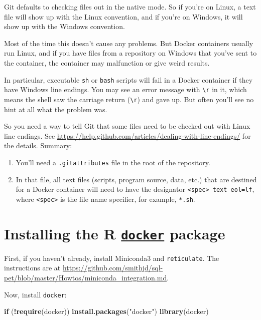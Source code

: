 \documentclass[]{book}
\newenvironment{Shaded}{\begin{snugshade}}{\end{snugshade}}
\newcommand{\ControlFlowTok}[1]{\textcolor[rgb]{0.13,0.29,0.53}{\textbf{#1}}}
\newcommand{\KeywordTok}[1]{\textcolor[rgb]{0.13,0.29,0.53}{\textbf{#1}}}
\newcommand{\NormalTok}[1]{#1}
\newcommand{\OperatorTok}[1]{\textcolor[rgb]{0.81,0.36,0.00}{\textbf{#1}}}
\newcommand{\StringTok}[1]{\textcolor[rgb]{0.31,0.60,0.02}{#1}}
\providecommand{\tightlist}{%
  \setlength{\itemsep}{0pt}\setlength{\parskip}{0pt}}
\theoremstyle{definition}
\theoremstyle{definition}
\theoremstyle{definition}
\theoremstyle{remark}
\begin{document}
Git defaults to checking files out in the native mode. So if you're on
Linux, a text file will show up with the Linux convention, and if you're
on Windows, it will show up with the Windows convention.

Most of the time this doesn't cause any problems. But Docker containers
usually run Linux, and if you have files from a repository on Windows
that you've sent to the container, the container may malfunction or give
weird results.

In particular, executable \texttt{sh} or \texttt{bash} scripts will fail
in a Docker container if they have Windows line endings. You may see an
error message with \texttt{\textbackslash{}r} in it, which means the
shell saw the carriage return (\texttt{\textbackslash{}r}) and gave up.
But often you'll see no hint at all what the problem was.

So you need a way to tell Git that some files need to be checked out
with Linux line endings. See
\url{https://help.github.com/articles/dealing-with-line-endings/} for
the details. Summary:

\begin{enumerate}
\def\labelenumi{\arabic{enumi}.}
\tightlist
\item
  You'll need a \texttt{.gitattributes} file in the root of the
  repository.
\item
  In that file, all text files (scripts, program source, data, etc.)
  that are destined for a Docker container will need to have the
  designator \texttt{\textless{}spec\textgreater{}\ text\ eol=lf}, where
  \texttt{\textless{}spec\textgreater{}} is the file name specifier, for
  example, \texttt{*.sh}.
\end{enumerate}

\hypertarget{installing-the-r-docker-package}{%
\section{\texorpdfstring{Installing the R
\href{https://bhaskarvk.github.io/docker/}{\texttt{docker}}
package}{Installing the R docker package}}\label{installing-the-r-docker-package}}

First, if you haven't already, install Miniconda3 and
\texttt{reticulate}. The instructions are at
\url{https://github.com/smithjd/sql-pet/blob/master/Howtos/miniconda_integration.md}.

Now, install \texttt{docker}:

\begin{Shaded}
\begin{Highlighting}[]
\ControlFlowTok{if}\NormalTok{ (}\OperatorTok{!}\KeywordTok{require}\NormalTok{(docker)) }\KeywordTok{install.packages}\NormalTok{(}\StringTok{"docker"}\NormalTok{)}
\KeywordTok{library}\NormalTok{(docker)}
\end{Highlighting}
\end{Shaded}
\end{document}
